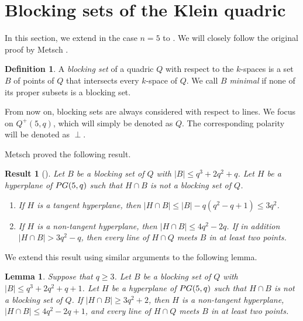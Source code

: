 \documentclass[a4paper]{article}
\newtheorem{lm}[thm]{Lemma}
\newtheorem{res}[thm]{Result}
\theoremstyle{definition}
\newtheorem{df}[thm]{Definition}
\newcommand{\pg}{\textnormal{PG}}
\newcommand{\PG}{\textnormal{PG}}
\begin{document}
\section{Blocking sets of the Klein quadric}
 \label{Sec:Klein}

In this section, we extend  in the case $n=5$ to .
We will closely follow the original proof by Metsch \cite{metsch2000blocking}.

\begin{df}
 A \emph{blocking set} of a quadric $Q$ with respect to the $k$-spaces is a set $B$ of points of $Q$ that intersects every $k$-space of $Q$.
 We call $B$ \emph{minimal} if none of its proper subsets is a blocking set.
\end{df}

From now on, blocking sets are always considered with respect to lines.
We focus on $Q^+(5,q)$, which will simply be denoted as $Q$.
The corresponding polarity will be denoted as $\perp$.

\bigskip

Metsch proved the following result.

\begin{res}[{\cite[Lemma 2.2]{metsch2000blocking}}]
 \label{Res:Metsch:Lemma2.2}
 Let $B$ be a blocking set of $Q$ with $|B| \leq q^3+2q^2+q$.
 Let $H$ be a hyperplane of $\pg(5,q)$ such that $H \cap B$ is not a blocking set of $Q$.
 \begin{enumerate}
  \item If $H$ is a tangent hyperplane, then $|H \cap B| \leq |B| - q(q^2-q+1) \leq 3q^2$.
  \item If $H$ is a non-tangent hyperplane, then $|H \cap B| \leq 4q^2-2q$.
  If in addition $|H \cap B| > 3q^2-q$, then every line of $H \cap Q$ meets $B$ in at least two points.
 \end{enumerate}
\end{res}

We extend this result using similar arguments to the following lemma.

\begin{lm}\label{lemma:block}
 Suppose that \(q \geq 3\).
 Let \(B\) be a blocking set of \(Q\) with \(|B|\leq q^3+2q^2+q+1\).
 Let \(H\) be a hyperplane of \(\PG(5,q)\) such that \(H\cap B\) is not a blocking set of \(Q\).
 If \(|H\cap B|\geq 3q^2+2\), then \(H\) is a non-tangent hyperplane, \(|H \cap B| \leq 4q^2-2q+1\), and every line of \(H\cap Q\) meets \(B\) in at least two points.
\end{lm}
\end{document}
